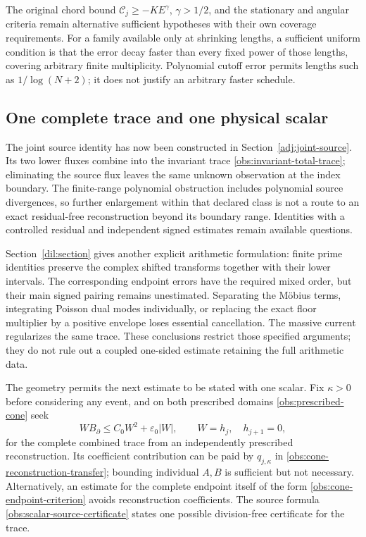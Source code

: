 \documentclass[11pt]{article}
\numberwithin{equation}{section}
\theoremstyle{definition}
\theoremstyle{remark}
\begin{document}
The original chord bound $\mathcal C_j\ge-KE^\gamma$,
$\gamma>1/2$, and the stationary and angular criteria remain
alternative sufficient hypotheses with their own coverage requirements.
For a family available only at shrinking lengths, a sufficient uniform condition is that the error decay
faster than every fixed power of those lengths, covering arbitrary finite
multiplicity. Polynomial cutoff error permits lengths such as
$1/\log(N+2)$; it does not justify an arbitrary faster schedule.

\subsection{One complete trace and one physical scalar}
The joint source identity has now been constructed in
Section~\ref{adj:joint-source}. Its two lower fluxes combine into the
invariant trace \eqref{obs:invariant-total-trace}; eliminating the
source flux leaves the same unknown observation at the index boundary.
The finite-range polynomial obstruction includes polynomial source
divergences, so further enlargement within that declared class is not
a route to an exact residual-free reconstruction beyond its boundary
range. Identities with a controlled residual and independent signed
estimates remain available questions.

Section~\ref{dil:section} gives another explicit arithmetic formulation:
finite prime identities preserve the complex shifted transforms together
with their lower intervals. The corresponding endpoint errors have the
required mixed order, but their main signed pairing remains unestimated.
Separating the M\"obius terms, integrating Poisson dual modes individually,
or replacing the exact floor multiplier by a positive envelope loses
essential cancellation. The massive current regularizes the same trace.
These conclusions restrict those specified arguments; they do not rule
out a coupled one-sided estimate retaining the full arithmetic data.

The geometry permits the next estimate to be stated with one scalar.
Fix $\kappa>0$ before considering any event, and on both prescribed
domains \eqref{obs:prescribed-cone} seek
\begin{equation}
 \boxed{WB_\partial\le C_0W^2+\varepsilon_0|W|,}
 \qquad W=h_j,\quad h_{j+1}=0,
 \label{next:signed-trace}
\end{equation}
for the complete combined trace from an independently prescribed
reconstruction. Its coefficient contribution can be paid by
$q_{j,\kappa}$ in \eqref{obs:cone-reconstruction-transfer}; bounding
individual $A,B$ is sufficient but not necessary. Alternatively, an
estimate for the complete endpoint itself of the form
\eqref{obs:cone-endpoint-criterion} avoids reconstruction coefficients.
The source formula \eqref{obs:scalar-source-certificate} states one
possible division-free certificate for the trace.
\end{document}
